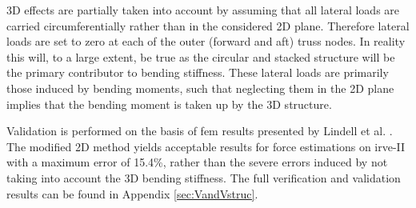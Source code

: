 3D effects are partially taken into account by assuming that all lateral loads are carried circumferentially rather than in the considered 2D plane. Therefore lateral loads are set to zero at each of the outer (forward and aft) truss nodes. In reality this will, to a large extent, be true as the circular and stacked structure will be the primary contributor to bending stiffness. These lateral loads are primarily those induced by bending moments, such that neglecting them in the 2D plane implies that the bending moment is taken up by the 3D structure. 

Validation is performed on the basis of \gls{fem} results presented by Lindell et al. \cite{Lindell2006}. The modified 2D method yields acceptable results for force estimations on \gls{irve}-II with a maximum error of 15.4\%, rather than the severe errors induced by not taking into account the 3D bending stiffness. The full verification and validation results can be found in Appendix \ref{sec:VandVstruc}.

